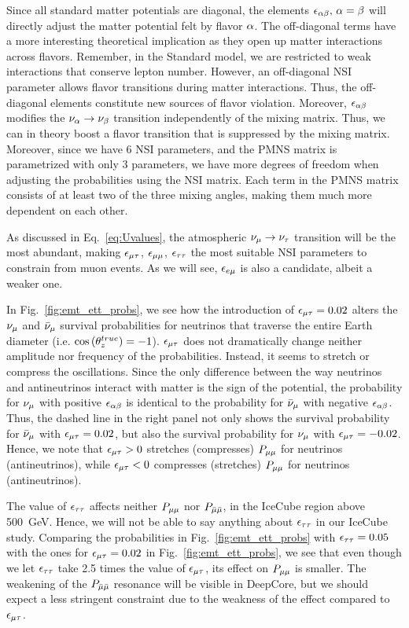 Since all standard matter potentials are diagonal, 
the elements $\epsilon_{\alpha\beta},\, \alpha = \beta$ will directly adjust the matter potential felt 
by flavor $\alpha$. The off-diagonal terms have a more interesting theoretical implication as they open up matter interactions across flavors. Remember, in the Standard model,
we are restricted to weak interactions that conserve lepton number. However, an off-diagonal NSI parameter allows flavor transitions during matter interactions. Thus,
the off-diagonal elements constitute new sources of flavor violation.
Moreover, $\epsilon_{\alpha\beta}$ modifies the $\nu_\alpha \to \nu_\beta$ transition independently
of the mixing matrix. Thus, we can in theory boost a flavor transition that is suppressed by the mixing matrix. Moreover, since we have 6 NSI parameters, and the PMNS
matrix is parametrized with only 3 parameters, we have more degrees of freedom when adjusting the probabilities using the NSI matrix. Each term in the PMNS matrix consists of at least
two of the three mixing angles, making them much more dependent on each other.

As discussed in Eq.~\ref{eq:Uvalues}, the atmospheric $\nu_\mu \to \nu_\tau$ transition will be the most abundant, making $\epsilon_{\mu\tau}$, $\epsilon_{\mu\mu}$, $\epsilon_{\tau\tau}$ the most suitable
NSI parameters to constrain from muon events. As we will see, $\epsilon_{e\mu}$ is also a candidate, albeit a weaker one. 

In Fig.~\ref{fig:emt_ett_probs}, we see how the introduction of $\epsilon_{\mu\tau} = 0.02$ alters the $\nu_\mu$ and $\bar{\nu}_\mu$ survival probabilities
for neutrinos that traverse the entire Earth diameter (i.e. $\cos{(\theta_z^{true})} = -1$). $\epsilon_{\mu\tau}$ does not dramatically change neither
amplitude nor frequency of the probabilities. Instead, it seems to stretch or compress the oscillations. Since the 
only difference between the way neutrinos and antineutrinos interact with matter is the sign of the potential, the probability for
$\nu_\mu$ with positive $\epsilon_{\alpha\beta}$ is identical to the probability for $\bar{\nu}_\mu$ with negative $\epsilon_{\alpha\beta}$. Thus, the dashed line 
in the right panel not only shows the survival probability for $\bar{\nu}_\mu$ with $\epsilon_{\mu\tau}=0.02$, but also the survival probability for $\nu_\mu$ with $\epsilon_{\mu\tau}=-0.02$.
Hence, we note that $\epsilon_{\mu\tau} > 0$ stretches (compresses) $P_{\mu\mu}$ for neutrinos (antineutrinos), while $\epsilon_{\mu\tau} < 0$ compresses (stretches) $P_{\mu\mu}$ for neutrinos (antineutrinos).

The value of $\epsilon_{\tau\tau}$ affects neither $P_{\mu\mu}$ nor $P_{\bar{\mu} \bar{\mu}}$, in the IceCube region above \SI{500}{\GeV}. Hence, we will not be able
to say anything about $\epsilon_{\tau\tau}$ in our IceCube study.  Comparing the probabilities in Fig.~\ref{fig:emt_ett_probs} with $\epsilon_{\tau\tau} = 0.05$ with the ones for $\epsilon_{\mu\tau} = 0.02$ in Fig.~\ref{fig:emt_ett_probs},
we see that even though we let $\epsilon_{\tau\tau}$ take 2.5 times the value of $\epsilon_{\mu\tau}$, its effect on $P_{\mu\mu}$ is smaller. The weakening of the $P_{\bar{\mu} \bar{\mu}}$ resonance will be visible in DeepCore, but we should expect a less stringent 
constraint due to the weakness of the effect compared to $\epsilon_{\mu\tau}$. 

